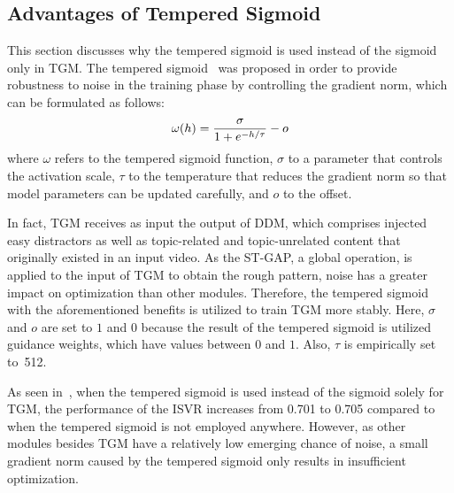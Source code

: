 \documentclass[10pt,twocolumn,letterpaper]{article}
\begin{document}
    \subsection{Advantages of Tempered Sigmoid} \label{tempered_exp}
        This section discusses why the tempered sigmoid is used instead of the sigmoid only in TGM. The tempered sigmoid~\cite{papernot2021tempered} was proposed in order to provide robustness to noise in the training phase by controlling the gradient norm, which can be formulated as follows:
        \begin{equation}
            \small
            \omega(h) = \frac{\sigma }{1+e^{-h/\tau}}-o
            \label{eq:tempered}
        \end{equation}
        where $\omega$ refers to the tempered sigmoid function, $\sigma$ to a parameter that controls the activation scale, $\tau$ to the temperature that reduces the gradient norm so that model parameters can be updated carefully, and $o$ to the offset.

        
        
        In fact, TGM receives as input the output of DDM, which comprises injected easy distractors as well as topic-related and topic-unrelated content that originally existed in an input video. As the ST-GAP, a global operation, is applied to the input of TGM to obtain the rough pattern, noise has a greater impact on optimization than other modules. Therefore, the tempered sigmoid with the aforementioned benefits is utilized to train TGM more stably. Here, $\sigma$ and $o$ are set to $1$ and $0$ because the result of the tempered sigmoid is utilized guidance weights, which have values between $0$ and $1$. Also, $\tau$ is empirically set to~512.
        
        As seen in~, when the tempered sigmoid is used instead of the sigmoid solely for TGM, the performance of the ISVR increases from 0.701 to 0.705 compared to when the tempered sigmoid is not employed anywhere. However, as other modules besides TGM have a relatively low emerging chance of noise, a small gradient norm caused by the tempered sigmoid only results in insufficient optimization.
\end{document}

